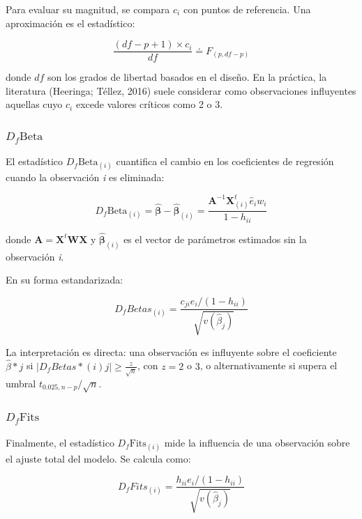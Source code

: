 \documentclass[
  spanish,
  12pt,
]{book}
\begin{document}
Para evaluar su magnitud, se compara \(c_i\) con puntos de referencia. Una aproximación es el estadístico:

\[
\frac{\left(df-p+1\right)\times c_{i}}{df} \doteq F_{\left(p,df-p\right)}
\]

donde \(df\) son los grados de libertad basados en el diseño. En la práctica, la literatura (Heeringa; Téllez, 2016) suele considerar como observaciones influyentes aquellas cuyo \(c_i\) excede valores críticos como 2 o 3.

\subsubsection{\texorpdfstring{\(D_f\text{Beta}\)}{D\_f\textbackslash text\{Beta\}}}\label{d_ftextbeta}

El estadístico \textbf{\(D_f \text{Beta}_{(i)}\)} cuantifica el cambio en los coeficientes de regresión cuando la observación \emph{i} es eliminada:

\[
D_f \text{Beta}_{(i)} = \hat{\boldsymbol{\beta}}-\hat{\boldsymbol{\beta}}_{\left(i\right)}=\frac{\boldsymbol{A}^{-1}\boldsymbol{X}_{\left(i\right)}^{t}\hat{e}_{i}w_{i}}{1-h_{ii}}
\]

donde \(\boldsymbol{A} =\boldsymbol{X}^{t}\boldsymbol{WX}\) y \(\hat{\boldsymbol{\beta}}_{(i)}\) es el vector de parámetros estimados sin la observación \emph{i}.

En su forma estandarizada:

\[
D_f Betas_{\left(i\right)}=\frac{{c_{ji}e_{i}}\big/{\left(1-h_{ii}\right)}}{\sqrt{v\left(\hat{\beta}_{j}\right)}}
\]

La interpretación es directa: una observación es influyente sobre el coeficiente \(\hat{\beta}*j\) si \(|D_f Betas*{(i)j}|\geq \frac{z}{\sqrt{n}}\), con \(z=2\) o \(3\), o alternativamente si supera el umbral \(t_{0.025,n-p}/\sqrt{n}\).

\subsubsection{\texorpdfstring{\(D_f \text{Fits}\)}{D\_f \textbackslash text\{Fits\}}}\label{d_f-textfits}

Finalmente, el estadístico \textbf{\(D_f \text{Fits}_{(i)}\)} mide la influencia de una observación sobre el ajuste total del modelo. Se calcula como:

\[
D_{f}Fits_{\left(i\right)}= \frac{h_{ii}e_{i}\big/\left(1-h_{ii}\right)}{\sqrt{v\left(\hat{\beta}_{j}\right)}}
\]
\end{document}
